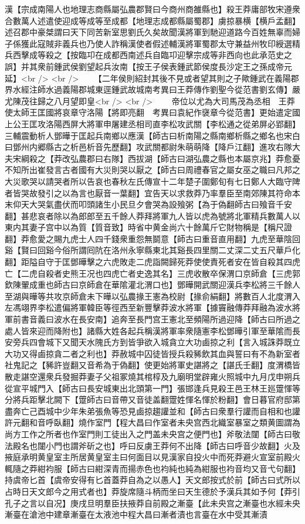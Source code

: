 漢【宗成南陽人也地理志商縣屬弘農郡賢曰今商州商雒縣也】殺王莽庸部牧宋遵衆合數萬人述遣使迎成等成等至成都【地理志成都縣屬蜀郡】虜掠暴横【横戶孟翻】述召郡中豪桀謂曰天下同苦新室思劉氏久矣故聞漢將軍到馳迎道路今百姓無辜而婦子係獲此寇賊非義兵也乃使人詐稱漢使者假述輔漢將軍蜀郡太守兼益州牧印綬選精兵西擊成等殺之【按臨卭在成都西南述兵自臨卭迎擊宗成等非西向也此承范史之誤】并其衆前鍾武侯劉望起兵汝南【按王子侯表鍾武節侯度長沙定王之孫成帝元延】<br />
<br />
　　【二年侯則紹封其後不見或者望其則之子歟鍾武在義陽郡界水經注師水過義陽郡城東逕鍾武故城南考異曰王莽傳作劉聖今從范書劉玄傳】嚴尤陳茂往歸之八月望即皇<br />
<br />
　　帝位以尤為大司馬茂為丞相　王莽使太師王匡國將哀章守洛陽【將即亮翻　考異曰袁紀作襃章今從范書】更始遣定國上公王匡攻洛陽西屏大將軍申屠建丞相司直李松攻武關【李松通之從弟屏必郢翻】三輔震動析人鄧曄于匡起兵南鄉以應漢【師古曰析南陽之縣南鄉析縣之鄉名也宋白曰鄧州内郷縣古之析邑析音先歷翻】攻武關都尉朱萌萌降【降戶江翻】進攻右隊大夫宋綱殺之【莽改弘農郡曰右隊】西拔湖【師古曰湖弘農之縣也本屬京兆】莽愈憂不知所出崔發言古者國有大災則哭以厭之【師古曰周禮春官之屬女巫之職曰凡邦之大災歌哭以請哭者所以告哀也春秋左氏傳宣十二年楚子圍鄭旬有七日鄭人大臨守陴者皆哭故發引之以為言也厭音一葉翻】宜告天以求救莽乃率羣臣至南郊陳其符命本末仰天大哭氣盡伏而叩頭諸生小民旦夕會哭為設飱粥【為于偽翻師古曰飱音千安翻】甚悲哀者除以為郎郎至五千餘人莽拜將軍九人皆以虎為號將北軍精兵數萬人以東内其妻子宫中以為質【質音致】時省中黄金尚六十餘萬斤它財物稱是【稱尺證翻】莽愈愛之賜九虎士人四千錢衆重怨無鬬意【師古曰重音直用翻】九虎至華陰回谿【賢曰回谿今俗所謂囘阬在洛州永寧縣東北其谿長四里關二丈深二丈五尺華戶化翻】距隘自守于匡鄧曄擊之六虎敗走二虎詣闕歸死莽使使責死者安在皆自殺其四虎亡【二虎自殺者史熊王况也四虎亡者史逸其名】三虎收散卒保渭口京師倉【三虎郭欽陳翬成重也師古曰京師倉在華隂灌北渭口也】鄧曄開武關迎漢兵李松將三千餘人至湖與曄等共攻京師倉未下曄以弘農掾王憲為校尉【掾俞絹翻】將數百人北度渭入左馮翊界李松遣偏將軍韓臣等徑西至新豐擊莽波水將軍【據竇融傳莽拜融為波水將軍前書音義曰波水在長安南】追奔至長門宫王憲北至頻陽所過迎降【師古曰所過之處人皆來迎而降附也】諸縣大姓各起兵稱漢將軍率衆隨憲李松鄧曄引軍至華隂而長安旁兵四會城下又聞天水隗氏方到皆爭欲入城貪立大功鹵掠之利【言入城誅莽既立大功又得鹵掠貪二者之利也】莽赦城中囚徒皆授兵殺豨飲其血與誓曰有不為新室者社鬼記之【豨許豈翻又音希為于偽翻】使更始將軍史諶將之【諶氏壬翻】度渭橋皆散走諶空還衆兵發掘莽妻子父祖冢燒其棺椁及九廟明堂辟雍火照城中九月戊申朔兵從宣平城門入【師古曰長安城東出北頭第一門】張邯逢兵見殺王邑王林王廵䠠惲等分將兵距擊北闕下【䠠師古曰音帶又音徒盖翻䠠姓惲名惲於粉翻】會日暮官府邸第盡奔亡己酉城中少年朱弟張魚等恐見鹵掠趨讙並和【師古曰衆羣行讙而自相和也讙許元翻和音呼臥翻】燒作室門【程大昌曰作室者未央宫西北織室暴室之類黄圖謂為尚方工作之所者也作室門則工徒出入之門盖未央宫之便門也】斧敬法闥【師古曰敬法殿名也闥小門也謂斧斫之也】呼曰反虜王莽何不出降【師古曰呼音少故翻】火及掖庭承明黄皇室主所居黄皇室主曰何面目以見漢家自投火中而死莽避火宣室前殿火輒隨之莽紺袀服【師古曰紺深青而揚赤色也袀純也純為紺服也袀音均又音弋句翻】持虞帝匕首【虞帝安得有匕首蓋莽自為之以愚人】天文郎按式於前【師古曰式所以占時日天文郎今之用式者也】莽旋席隨斗柄而坐曰天生德於予漢兵其如予何【莽引孔子之言以自况】庚戌旦明羣臣扶掖莽自前殿之漸臺【此未央宫之漸臺也水經未央漸臺在滄池中建章漸臺在太液池中程大昌曰漸者漬也言臺在水中受其漸漬